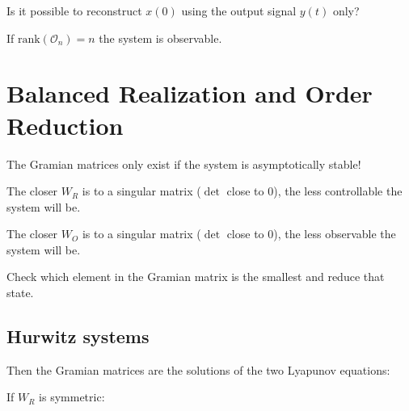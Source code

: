 \documentclass[10pt,a4paper]{scrartcl}
\begin{document}
\begin{multicols*}{3}
Is it possible to reconstruct $x(0)$ using the output signal $y(t)$ only?


If $\text{rank}(\mathcal{O}_n)=n$ the system is observable.

\vfill

\section{Balanced Realization and Order Reduction}

The Gramian matrices only exist if the system is asymptotically stable!


The closer $W_R$ is to a singular matrix ($\det$ close to 0), the less controllable the system will be.


The closer $W_O$ is to a singular matrix ($\det$ close to 0), the less observable the system will be.

\dahe Check which element in the Gramian matrix is the smallest and reduce that state.

\columnbreak

\subsection{Hurwitz systems}


Then the Gramian matrices are the solutions of the two Lyapunov equations:


If $W_R$ is symmetric:




\end{multicols*}
\end{document}
